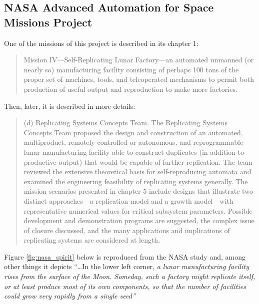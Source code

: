 \subsection[NASA Advanced Automation for Space Missions Project]{NASA
Advanced Automation for Space Missions Project}

One of the missions of this
project is described in its chapter 1:

\begin{quote}
Mission IV---Self-Replicating Lunar Factory---an
automated unmanned (or nearly so) manufacturing facility consisting of
perhaps 100 tons of the proper set of machines, tools, and teleoperated
mechanisms to permit both production of useful output and reproduction
to make more factories.
\end{quote}

Then, later, it is described in more details:

\begin{quote}
(d) Replicating Systems Concepts Team. The
Replicating Systems Concepts Team proposed the design and construction
of an automated, multiproduct, remotely controlled or autonomous, and
reprogrammable lunar manufacturing facility able to construct
duplicates (in addition to productive output) that would be capable of
further replication. The team reviewed the extensive theoretical basis
for self-reproducing automata and examined the engineering feasibility
of replicating systems generally. The mission scenarios presented in
chapter 5 include designs that illustrate two distinct approaches---a
replication model and a growth model---with representative numerical
values for critical subsystem parameters. Possible development and
demonstration programs are suggested, the complex issue of closure
discussed, and the many applications and implications of replicating
systems are considered at length.
\end{quote}

Figure \ref{fig:nasa_spirit} below is reproduced from the NASA study and, among other things it
depicts ``{\ldots}In the lower left corner, \textit{a lunar
manufacturing facility rises from the surface of the Moon. Someday,
such a factory might replicate itself, or at least produce most of its
own components, so that the number of facilities could grow very
rapidly from a single seed'' }


